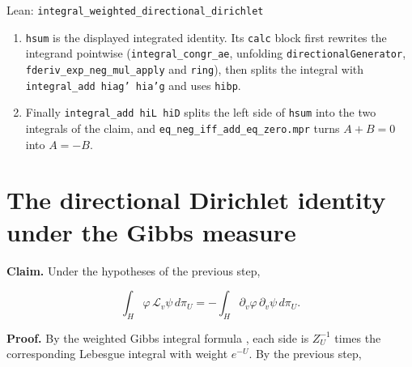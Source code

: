 \documentclass[11pt,a4paper]{article}
\begin{document}
\begin{leanbox}{Lean: \texttt{integral\_\allowbreak{}weighted\_\allowbreak{}directional\_\allowbreak{}dirichlet}}
\begin{enumerate}
\item \texttt{hsum} is the displayed integrated identity. Its \texttt{calc} block first rewrites the integrand pointwise (\texttt{integral\_\allowbreak{}congr\_\allowbreak{}ae}, unfolding \texttt{directional\allowbreak{}Generator}, \texttt{fderiv\_\allowbreak{}exp\_\allowbreak{}neg\_\allowbreak{}mul\_\allowbreak{}apply} and \texttt{ring}), then splits the integral with \texttt{integral\_\allowbreak{}add hiag' hia'g} and uses \texttt{hibp}.

\item Finally \texttt{integral\_\allowbreak{}add hi\allowbreak{}L hi\allowbreak{}D} splits the left side of \texttt{hsum} into the two integrals of the claim, and \texttt{eq\_\allowbreak{}neg\_\allowbreak{}iff\_\allowbreak{}add\_\allowbreak{}eq\_\allowbreak{}zero.\allowbreak{}mpr} turns \(A+B=0\) into \(A=-B\).

\end{enumerate}
\end{leanbox}

\section{\texorpdfstring{The directional Dirichlet identity under the Gibbs measure}{The directional Dirichlet identity under the Gibbs measure}}


\textbf{Claim.} Under the hypotheses of the previous step,


\[\int_H\varphi\,\mathcal L_v\psi\,d\pi_U=-\int_H\partial_v\varphi\,\partial_v\psi\,d\pi_U.\]


\textbf{Proof.} By the weighted Gibbs integral formula \cite[Section~3.46.3]{LangevinLean2026ULASC}, each side is \(Z_U^{-1}\) times the corresponding Lebesgue integral with weight \(e^{-U}\). By the previous step,
\end{document}
